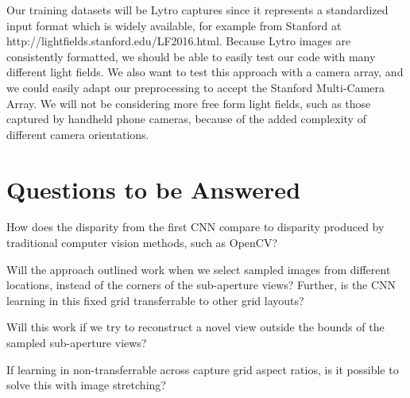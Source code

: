 \documentclass[10pt,twocolumn,letterpaper]{article}
\begin{document}
Our training datasets will be Lytro captures since it represents a standardized input format which is
widely available, for example from Stanford at http://lightfields.stanford.edu/LF2016.html.
Because Lytro images are consistently formatted, we should be able to easily test our code with many different
light fields. We also want to test this approach with a camera array, and we could easily adapt our preprocessing
to accept the Stanford Multi-Camera Array. We will not be considering more free form light fields, such as those
captured by handheld phone cameras, because of the added complexity of different camera orientations.

\section{Questions to be Answered}

How does the disparity from the first CNN compare to disparity produced 
by traditional computer vision methods, such as OpenCV?

Will the approach outlined work when we select sampled images from different locations, instead 
of the corners of the sub-aperture views? Further, is the CNN learning in this fixed grid transferrable
to other grid layouts?

Will this work if we try to reconstruct a novel view outside the bounds of the sampled sub-aperture views?

If learning in non-transferrable across capture grid aspect ratios, is it possible to solve this with
image stretching?

{\small


}
\end{document}
